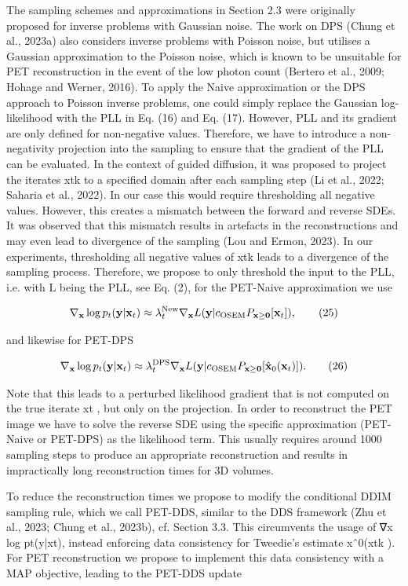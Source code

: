 \documentclass{article}
\begin{document}
The sampling schemes and approximations in Section 2.3 were originally proposed for inverse problems with Gaussian noise. The work on DPS (Chung et al., 2023a) also considers inverse problems with Poisson noise, but utilises a Gaussian approximation to the Poisson noise, which is known to be unsuitable for PET reconstruction in the event of the low photon count (Bertero et al., 2009; Hohage and Werner, 2016). To apply the Naive approximation or the DPS approach to Poisson inverse problems, one could simply replace the Gaussian log-likelihood with the PLL in Eq. (16) and Eq. (17). However, PLL and its gradient are only defined for non-negative values. Therefore, we have to introduce a non-negativity projection into the sampling to ensure that the gradient of the PLL can be evaluated. In the context of guided diffusion, it was proposed to project the iterates xtk to a specified domain after each sampling step (Li et al., 2022; Saharia et al., 2022). In our case this would require thresholding all negative values. However, this creates a mismatch between the forward and reverse SDEs. It was observed that this mismatch results in artefacts in the reconstructions and may even lead to divergence of the sampling (Lou and Ermon, 2023). In our experiments, thresholding all negative values of xtk leads to a divergence of the sampling process. Therefore, we propose to only threshold the input to the PLL, i.e. with L being the PLL, see Eq. (2), for the PET-Naive approximation we use

$$\nabla_{\bf x}\log p_{t}({\bf y}|{\bf x}_{t})\approx\lambda_{t}^{\rm New}\nabla_{\bf x}L({\bf y}|c_{\rm OSEM}P_{\bf x\geq0}[{\bf x}_{t}]),\tag{25}$$

and likewise for PET-DPS

$$\nabla_{\bf x}\log p_{t}({\bf y}|{\bf x}_{t})\approx\lambda_{t}^{\rm DPS}\nabla_{\bf x}L({\bf y}|c_{\rm OSEM}P_{\bf x\geq0}[\hat{\bf x}_{0}({\bf x}_{t})]).\tag{26}$$

Note that this leads to a perturbed likelihood gradient that is not computed on the true iterate xt , but only on the projection. In order to reconstruct the PET image we have to solve the reverse SDE using the specific approximation (PET-Naive or PET-DPS) as the likelihood term. This usually requires around 1000 sampling steps to produce an appropriate reconstruction and results in impractically long reconstruction times for 3D volumes.

To reduce the reconstruction times we propose to modify the conditional DDIM sampling rule, which we call PET-DDS, similar to the DDS framework (Zhu et al., 2023; Chung et al., 2023b), cf. Section 3.3. This circumvents the usage of ∇x log pt(y|xt), instead enforcing data consistency for Tweedie's estimate xˆ0(xtk ). For PET reconstruction we propose to implement this data consistency with a MAP objective, leading to the PET-DDS update
\end{document}
